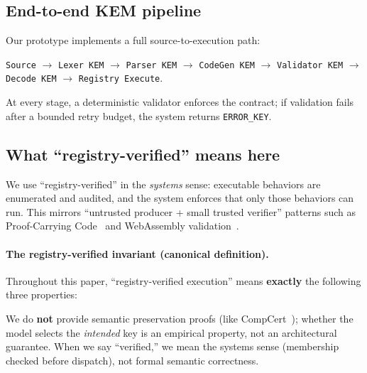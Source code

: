 \documentclass[11pt]{article}
\begin{document}
\subsection{End-to-end KEM pipeline}
Our prototype implements a full source-to-execution path:
\begin{center}
\texttt{Source} $\rightarrow$ \texttt{Lexer KEM} $\rightarrow$ \texttt{Parser KEM} $\rightarrow$ \texttt{CodeGen KEM} $\rightarrow$ \texttt{Validator KEM} $\rightarrow$ \texttt{Decode KEM} $\rightarrow$ \texttt{Registry Execute}.
\end{center}
At every stage, a deterministic validator enforces the contract; if validation fails after a bounded retry budget, the system returns \texttt{ERROR\_KEY}.

\subsection{What ``registry-verified'' means here}
We use ``registry-verified'' in the \emph{systems} sense: executable behaviors are enumerated and audited, and the system enforces that only those behaviors can run.
This mirrors ``untrusted producer + small trusted verifier'' patterns such as Proof-Carrying Code~\cite{necula1997pcc} and WebAssembly validation~\cite{haas2017wasm,watt2018wasm}.

\paragraph{The registry-verified invariant (canonical definition).}
\label{def:registry-verified}
Throughout this paper, ``registry-verified execution'' means \textbf{exactly} the following three properties:
\begin{center}
\end{center}
\noindent We do \textbf{not} provide semantic preservation proofs (like CompCert~\cite{leroy2009compcert}); whether the model selects the \emph{intended} key is an empirical property, not an architectural guarantee. When we say ``verified,'' we mean the systems sense (membership checked before dispatch), not formal semantic correctness.
\end{document}
